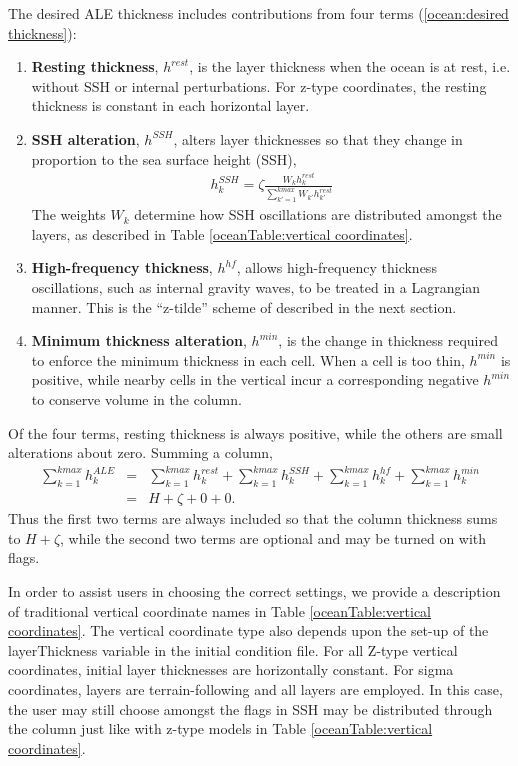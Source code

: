 The desired ALE thickness includes contributions from four terms (\ref{ocean:desired thickness}):
\begin{enumerate}
\item {\bf Resting thickness}, $h^{rest}$, is the layer thickness when the ocean is at rest, i.e. without SSH or internal perturbations.  For z-type coordinates, the resting thickness is constant in each horizontal layer.
\item {\bf SSH alteration}, $h^{SSH}$, alters layer thicknesses so that they change in proportion to the sea surface height (SSH),
\begin{eqnarray}
\label{ocean:h ssh}
   h_k^{SSH} =  \zeta \frac{W_k h^{rest}_k}{\sum_{k'=1}^{kmax}W_{k'}h^{rest}_{k'}}
\end{eqnarray}
The weights $W_k$ determine how SSH oscillations are distributed amongst the layers, as described in Table \ref{oceanTable:vertical coordinates}.
\item {\bf High-frequency thickness}, $h^{hf}$, allows high-frequency thickness oscillations, such as internal gravity waves, to be treated in a Lagrangian manner.  This is the ``z-tilde'' scheme of \citet{Leclair_Madec11om} described in the next section.
\item {\bf Minimum thickness alteration}, $h^{min}$, is the change in thickness required to enforce the minimum thickness in each cell.  When a cell is too thin, $h^{min}$ is positive, while nearby cells in the vertical incur a corresponding negative $h^{min}$ to conserve volume in the column.
\end{enumerate}
Of the four terms, resting thickness is always positive, while the others are small alterations about zero.  Summing a column,
\begin{eqnarray}
\sum_{k=1}^{kmax} h_k^{ALE} &=& \sum_{k=1}^{kmax} h_k^{rest} + \sum_{k=1}^{kmax}h_k^{SSH} + \sum_{k=1}^{kmax}h_k^{hf} + \sum_{k=1}^{kmax}h_k^{min} 
\nonumber \\
&=& H + \zeta + 0 + 0.
\nonumber
\end{eqnarray}
Thus the first two terms are always included so that the column thickness sums to $H+\zeta$, while the second two terms are optional and may be turned on with flags.

In order to assist users in choosing the correct settings, we provide a description of traditional vertical coordinate names in Table \ref{oceanTable:vertical coordinates}.
The vertical coordinate type also depends upon the set-up of the layerThickness variable in the initial condition file.  For all Z-type vertical coordinates, initial layer thicknesses are horizontally constant.  For sigma coordinates, layers are terrain-following and all layers are employed.  In this case, the user may still choose amongst the flags in SSH may be distributed through the column just like with z-type models in Table \ref{oceanTable:vertical coordinates}.

